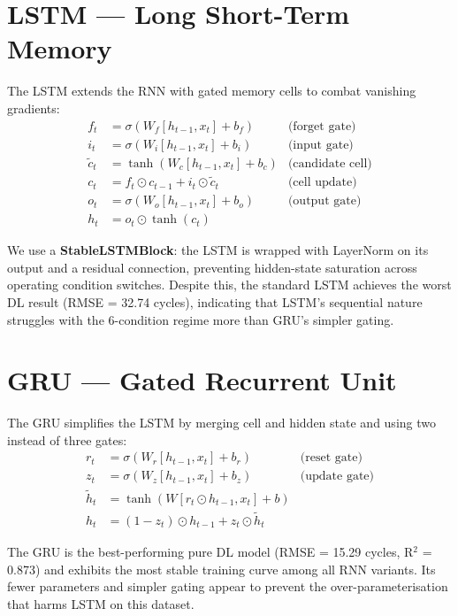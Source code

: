 \documentclass[12pt,a4paper]{report}
\begin{document}
\section{LSTM — Long Short-Term Memory}

The LSTM extends the RNN with gated memory cells to combat vanishing gradients:
\[
\begin{aligned}
f_t &= \sigma(W_f [h_{t-1}, x_t] + b_f) & \text{(forget gate)}\\
i_t &= \sigma(W_i [h_{t-1}, x_t] + b_i) & \text{(input gate)}\\
\tilde{c}_t &= \tanh(W_c [h_{t-1}, x_t] + b_c) & \text{(candidate cell)}\\
c_t &= f_t \odot c_{t-1} + i_t \odot \tilde{c}_t & \text{(cell update)}\\
o_t &= \sigma(W_o [h_{t-1}, x_t] + b_o) & \text{(output gate)}\\
h_t &= o_t \odot \tanh(c_t)
\end{aligned}
\]

We use a \textbf{StableLSTMBlock}: the LSTM is wrapped with LayerNorm on its output and a residual connection, preventing hidden-state saturation across operating condition switches. Despite this, the standard LSTM achieves the worst DL result (RMSE = 32.74 cycles), indicating that LSTM's sequential nature struggles with the 6-condition regime more than GRU's simpler gating.

\section{GRU — Gated Recurrent Unit}

The GRU simplifies the LSTM by merging cell and hidden state and using two instead of three gates:
\[
\begin{aligned}
r_t &= \sigma(W_r [h_{t-1}, x_t] + b_r) & \text{(reset gate)}\\
z_t &= \sigma(W_z [h_{t-1}, x_t] + b_z) & \text{(update gate)}\\
\tilde{h}_t &= \tanh(W [r_t \odot h_{t-1}, x_t] + b)\\
h_t &= (1-z_t) \odot h_{t-1} + z_t \odot \tilde{h}_t
\end{aligned}
\]

The GRU is the best-performing pure DL model (RMSE = 15.29 cycles, R$^2$ = 0.873) and exhibits the most stable training curve among all RNN variants. Its fewer parameters and simpler gating appear to prevent the over-parameterisation that harms LSTM on this dataset.
\end{document}
